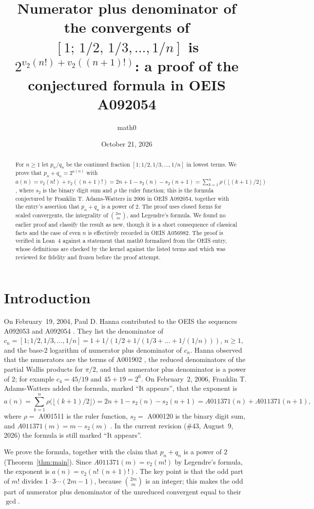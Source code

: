 \documentclass[11pt]{amsart}
\title[{Numerator plus denominator of the convergents of $[1;1/2,\dots,1/n]$}]{Numerator plus denominator of the convergents of $[1;\,1/2,\,1/3,\dots,1/n]$ is $2^{v_2(n!)+v_2((n+1)!)}$: a proof of the conjectured formula in OEIS A092054}
\author{math0}
\date{October 21, 2026}
\theoremstyle{plain}
\theoremstyle{definition}
\begin{document}
\begin{abstract}
For $n\ge1$ let $p_n/q_n$ be the continued fraction $[1;1/2,1/3,\dots,1/n]$ in lowest terms.
We prove that $p_n+q_n=2^{a(n)}$ with $a(n)=v_2(n!)+v_2((n+1)!)=2n+1-s_2(n)-s_2(n+1)=\sum_{k=1}^{n}\rho(\lfloor(k+1)/2\rfloor)$, where $s_2$ is the binary digit sum and $\rho$ the ruler function; this is the formula conjectured by Franklin T. Adams-Watters in 2006 in OEIS A092054, together with the entry's assertion that $p_n+q_n$ is a power of $2$.
The proof uses closed forms for scaled convergents, the integrality of $\binom{2m}{m}$, and Legendre's formula.
We found no earlier proof and classify the result as new, though it is a short consequence of classical facts and the case of even $n$ is effectively recorded in OEIS A056982.
The proof is verified in Lean~4 against a statement that math0 formalized from the OEIS entry, whose definitions are checked by the kernel against the listed terms and which was reviewed for fidelity and frozen before the proof attempt.
\end{abstract}
\maketitle

\section{Introduction}

On February~19, 2004, Paul D. Hanna contributed to the OEIS the sequences A092053 \cite{A092053} and A092054 \cite{A092054}. They list the denominator of $c_n=[1;1/2,1/3,\dots,1/n]=1+1/(1/2+1/(1/3+\dots+1/(1/n)))$, $n\ge1$, and the base-$2$ logarithm of numerator plus denominator of $c_n$. Hanna observed that the numerators are the terms of A001902 \cite{A001901}, the reduced denominators of the partial Wallis products for $\pi/2$, and that numerator plus denominator is a power of $2$; for example $c_4=45/19$ and $45+19=2^6$. On February~2, 2006, Franklin T. Adams-Watters added the formula, marked ``It appears'', that the exponent is
\[
  a(n)=\sum_{k=1}^{n}\rho\bigl(\lfloor (k+1)/2\rfloor\bigr)=2n+1-s_2(n)-s_2(n+1)=A011371(n)+A011371(n+1),
\]
where $\rho=$ A001511 \cite{OEIS} is the ruler function, $s_2=$ A000120 \cite{OEIS} is the binary digit sum, and $A011371(m)=m-s_2(m)$ \cite{OEIS}. In the current revision (\#43, August~9, 2026) the formula is still marked ``It appears''.

We prove the formula, together with the claim that $p_n+q_n$ is a power of $2$ (Theorem~\ref{thm:main}). Since $A011371(m)=v_2(m!)$ by Legendre's formula, the exponent is $a(n)=v_2(n!\,(n+1)!)$. The key point is that the odd part of $m!$ divides $1\cdot3\cdots(2m-1)$, because $\binom{2m}{m}$ is an integer; this makes the odd part of numerator plus denominator of the unreduced convergent equal to their $\gcd$.
\end{document}
